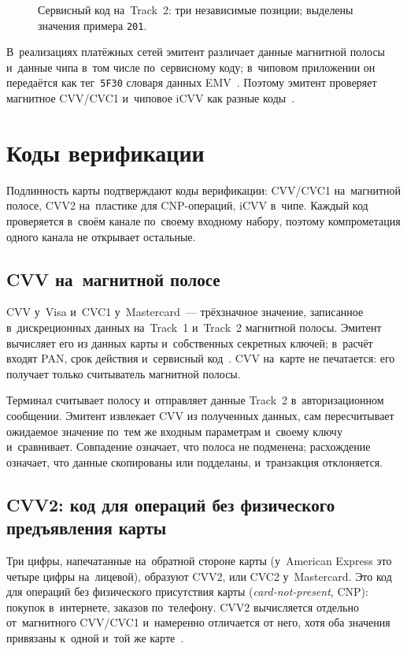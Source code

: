 \begin{figure}[H]
  \centering
  \caption{Сервисный код на~Track~2: три независимые позиции; выделены значения примера \texttt{201}.}\label{fig:service-code}
\end{figure}

В~реализациях платёжных сетей эмитент различает данные магнитной полосы
и~данные чипа в~том числе по~сервисному коду; в~чиповом приложении он
передаётся как тег~\texttt{5F30} словаря данных EMV~\cite{emvco-book3}.
Поэтому эмитент проверяет магнитное CVV/CVC1 и~чиповое iCVV как разные
коды~\cite{visa-vsdc-guide,mc-security-rules-2016}.

\section{Коды верификации}\label{sec:card-data-cvv}

Подлинность карты подтверждают коды верификации: CVV/CVC1 на~магнитной полосе,
CVV2 на~пластике для CNP-операций, iCVV в~чипе. Каждый код проверяется
в~своём канале по~своему входному набору, поэтому компрометация одного канала
не открывает остальные.

\subsection*{CVV на~магнитной полосе}

CVV у~Visa и~CVC1 у~Mastercard~--- трёхзначное значение, записанное
в~дискреционных данных на~Track~1 и~Track~2 магнитной полосы. Эмитент вычисляет
его из данных карты и~собственных секретных ключей; в~расчёт входят PAN, срок
действия и~сервисный код~\cite{mc-security-rules-2016}. CVV на~карте не
печатается: его получает только считыватель магнитной полосы.

Терминал считывает полосу и~отправляет данные Track~2 в~авторизационном
сообщении. Эмитент извлекает CVV из полученных данных, сам пересчитывает
ожидаемое значение по~тем же входным параметрам и~своему ключу и~сравнивает.
Совпадение означает, что полоса не подменена; расхождение означает, что данные
скопированы или подделаны, и~транзакция отклоняется.

\subsection*{CVV2: код для операций без физического предъявления карты}

Три цифры, напечатанные на~обратной стороне карты (у~American Express это
четыре цифры на~лицевой), образуют CVV2, или CVC2 у~Mastercard. Это код для
операций без физического присутствия карты (\textit{card-not-present}, CNP):
покупок в~интернете, заказов по~телефону. CVV2 вычисляется отдельно
от~магнитного CVV/CVC1 и~намеренно отличается от него, хотя оба значения
привязаны к~одной и~той же карте~\cite{mc-security-rules-2016}.


